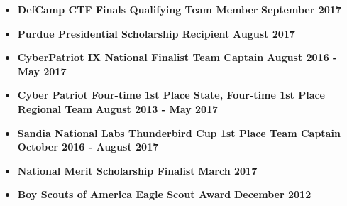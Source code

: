 \documentclass[letterpaper,10pt]{article}
\begin{document}
\begin{flushleft}
\begin{itemize}
		\item \textbf{DefCamp CTF Finals Qualifying Team Member} \hfill \textbf{September 2017} \\
		\item \textbf{Purdue Presidential Scholarship Recipient} \hfill \textbf{August 2017} \\
		\item \textbf{CyberPatriot IX National Finalist Team Captain} \hfill \textbf{August 2016 - May 2017} \\
		\item \textbf{Cyber Patriot Four-time 1st Place State, Four-time 1st Place Regional Team} \hfill \textbf{August 2013 - May 2017} \\
		\item \textbf{Sandia National Labs Thunderbird Cup 1st Place Team Captain} \hfill \textbf{October 2016 - August 2017} \\
		\item \textbf{National Merit Scholarship Finalist} \hfill \textbf{March 2017} \\
		\item \textbf{Boy Scouts of America Eagle Scout Award} \hfill \textbf{December 2012}
	\end{itemize}
\end{flushleft}
\end{document}
